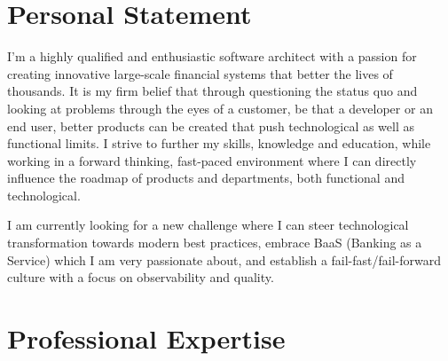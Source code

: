 \documentclass[11pt,a4paper]{my_cv}
\begin{document}
\begin{cvheader}
\end{cvheader}

\section{Personal Statement}
I'm a highly qualified and enthusiastic software architect with a passion for creating innovative large-scale financial systems that better the lives of thousands.
It is my firm belief that through questioning the status quo and looking at problems through the eyes of a customer, be that a developer or an end user, better products can be created that push technological as well as functional limits.
I strive to further my skills, knowledge and education, while working in a forward thinking, fast-paced environment where I can directly influence the roadmap of products and departments, both functional and technological.

I am currently looking for a new challenge where I can steer technological transformation towards modern best practices, embrace BaaS (Banking as a Service) which I am very passionate about, and establish a fail-fast/fail-forward culture with a focus on observability and quality.  

\section{Professional Expertise}
\begin{expertise}
\end{expertise}
\end{document}
